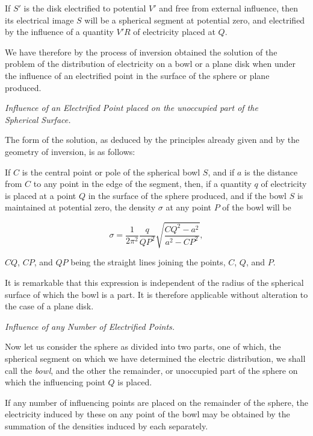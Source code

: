 \documentclass[11pt,a4paper]{article}
\begin{document}
If $S'$ is the disk electrified to potential $V'$ and free from external influence, then its electrical image $S$ will be a spherical segment at potential zero, and electrified by the influence of a quantity $V'R$ of electricity placed at $Q$.

We have therefore by the process of inversion obtained the solution of the problem of the distribution of electricity on a bowl or a plane disk when under the influence of an electrified point in the surface of the sphere or plane produced.

\begin{center}
\textit{Influence of an Electrified Point placed on the unoccupied part of the}\\
\textit{Spherical Surface.}
\end{center}

The form of the solution, as deduced by the principles already given and by the geometry of inversion, is as follows:

If $C$ is the central point or pole of the spherical bowl $S$, and if $a$ is the distance from $C$ to any point in the edge of the segment, then, if a quantity $q$ of electricity is placed at a point $Q$ in the surface of the sphere produced, and if the bowl $S$ is maintained at potential zero, the density $\sigma$ at any point $P$ of the bowl will be

\[
\sigma = \frac{1}{2\pi^2}\frac{q}{QP^2}
\sqrt{\frac{CQ^2-a^2}{a^2-CP^2}},
\]

$CQ$, $CP$, and $QP$ being the straight lines joining the points, $C$, $Q$, and $P$.

It is remarkable that this expression is independent of the radius of the spherical surface of which the bowl is a part. It is therefore applicable without alteration to the case of a plane disk.

\begin{center}
\textit{Influence of any Number of Electrified Points.}
\end{center}

Now let us consider the sphere as divided into two parts, one of which, the spherical segment on which we have determined the electric distribution, we shall call the \textit{bowl}, and the other the remainder, or unoccupied part of the sphere on which the influencing point $Q$ is placed.

If any number of influencing points are placed on the remainder of the sphere, the electricity induced by these on any point of the bowl may be obtained by the summation of the densities induced by each separately.
\end{document}
